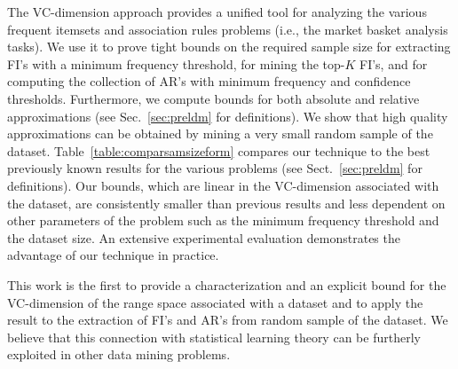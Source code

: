The VC-dimension approach provides a unified tool for analyzing the various
frequent itemsets and association rules problems (i.e., the market basket
analysis tasks). We use it to prove tight bounds on the required
sample size for extracting FI's with a minimum frequency threshold, for mining
the top-$K$ FI's, and for computing the collection of AR's with minimum
frequency and confidence thresholds. Furthermore, we compute bounds for both
absolute and relative approximations (see Sec.~\ref{sec:preldm} for definitions).
We show that high quality approximations can be obtained by mining a very small
random sample of the dataset. Table~\ref{table:comparsamsizeform} compares our
technique to the best previously known results for the various problems (see
Sect.~\ref{sec:preldm} for definitions). Our bounds, which are linear in the
VC-dimension associated with the dataset, are consistently smaller than previous
results and less dependent on other parameters of the problem such as the
minimum frequency threshold and the dataset size. An extensive
experimental evaluation demonstrates the advantage of our technique in practice.

This work is the first to provide a characterization and an explicit bound for
the VC-dimension of the range space associated with a dataset and to apply the
result to the extraction of FI's and AR's from random sample of the dataset. We
believe that this connection with statistical learning theory can be furtherly
exploited in other data mining problems.

